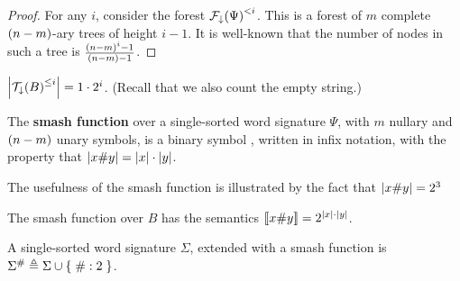 \begin{proof} For any $i$, consider the forest
$\mathcal{F}_\downarrow\p{\Psi}^{< i}$. This is a forest of $m$ complete
$\p{n-m}$-ary trees of height $i-1$. It is well-known that the number of nodes
in such a tree is $\frac{\p{n-m}^i-1}{\p{n - m} - 1}$\cite{cormen-et-al-2009}.
\end{proof}

\begin{example} $\card{\mathcal{T}_\downarrow\p{B}^{\leq i}} = 1 \cdot 2^i$.
(Recall that we also count the empty string.) \end{example}







\begin{definition} The \textbf{smash function} over a single-sorted word
signature $\Psi$, with $m$ nullary and $\p{n-m}$ unary symbols, is a binary
symbol \smashf{}, written in infix notation, with the property that $\card{x
\smashf{} y} = {\card{x}\cdot\card{y}}$.\end{definition}

The usefulness of the smash function is illustrated by the fact that $\card{x
\smashf{} y} = 2^3$

\begin{example} The smash function over $B$ has the semantics $\sem{x \smashf{}
y} = 2^{\card{x} \cdot \card{y}}$. \end{example}

\begin{definition} A single-sorted word signature $\Sigma$, extended with a
smash function is $\Sigma^\smashf{} \triangleq \Sigma \cup \set { \smashf{} : 2
}$. \end{definition}


